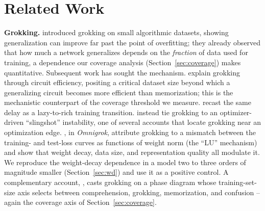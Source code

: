\documentclass[10pt]{article} %
\begin{document}
\section{Related Work}
\label{sec:related}

\textbf{Grokking.} \citet{power2022grokking} introduced grokking on small algorithmic datasets,
showing generalization can improve far past the point of overfitting; they already observed that
how much a network generalizes depends on the \emph{fraction} of data used for training, a
dependence our coverage analysis (Section~\ref{sec:coverage}) makes quantitative. Subsequent work
has sought the mechanism. \citet{varma2023circuit} explain grokking through circuit efficiency,
positing a critical dataset size beyond which a generalizing circuit becomes more efficient than
memorization; this is the mechanistic counterpart of the coverage threshold we measure.
\citet{kumar2024grokking} recast the same delay as a lazy-to-rich training transition.
\citet{thilak2022slingshot} instead tie grokking to an optimizer-driven ``slingshot'' instability,
one of several accounts that locate grokking near an optimization edge. \citet{liu2022omnigrok},
in \emph{Omnigrok}, attribute grokking to a mismatch
between the training- and test-loss curves as functions of weight norm (the ``LU'' mechanism) and
show that weight decay, data size, and representation quality all modulate it. We reproduce the weight-decay dependence in a model two to three
orders of magnitude smaller (Section~\ref{sec:wd}) and use it as a positive control. A
complementary account, \citet{liu2022understanding}, casts grokking on a phase diagram whose
training-set-size axis selects between comprehension, grokking, memorization, and confusion -- again
the coverage axis of Section~\ref{sec:coverage}.
\end{document}
